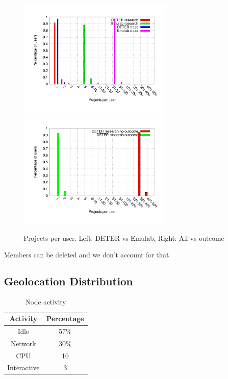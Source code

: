 \begin{figure}[htbp] \begin{center} \includegraphics[width=3in,
type=pdf,ext=.pdf,read=.pdf]{figs/user.proj.gnu}
\includegraphics[width=3in,
type=pdf,ext=.pdf,read=.pdf]{figs/user.proj.cmp.gnu} \caption{Projects
per user. Left: DETER vs Emulab, Right: All vs outcome} \label{userproj}
\end{center} \end{figure}

Members can be deleted and we don't account for that



\subsection{Geolocation Distribution} 



\begin{table}[htdp] \caption{Node activity} \begin{center}
\begin{tabular}{|c|c|} \hline Activity & Percentage \\ \hline Idle &
57\% \\ Network & 30\% \\ CPU & 10\\ Interactive & 3 \\ \hline
\end{tabular} \end{center} \label{default} \end{table}%

